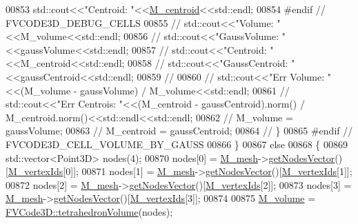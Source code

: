 \begin{DoxyCode}
00853         std::cout<<\textcolor{stringliteral}{"Centroid: "}<<\hyperlink{classFVCode3D_1_1Mesh3D_1_1Cell3D_a85077932a074f0903d085f9d33a13e09}{M\_centroid}<<std::endl;
00854 \textcolor{preprocessor}{#endif // FVCODE3D\_DEBUG\_CELLS}
00855 \textcolor{comment}{//        std::cout<<"Volume: "<<M\_volume<<std::endl;}
00856 \textcolor{comment}{//        std::cout<<"GaussVolume: "<<gaussVolume<<std::endl;}
00857 \textcolor{comment}{//        std::cout<<"Centroid: "<<M\_centroid<<std::endl;}
00858 \textcolor{comment}{//        std::cout<<"GaussCentroid: "<<gaussCentroid<<std::endl;}
00859 \textcolor{comment}{//}
00860 \textcolor{comment}{//        std::cout<<"Err Volume: "<<(M\_volume - gaussVolume) / M\_volume<<std::endl;}
00861 \textcolor{comment}{//        std::cout<<"Err Centrois: "<<(M\_centroid - gaussCentroid).norm() /
       M\_centroid.norm()<<std::endl<<std::endl;}
00862 \textcolor{comment}{//        M\_volume = gaussVolume;}
00863 \textcolor{comment}{//        M\_centroid = gaussCentroid;}
00864 \textcolor{comment}{//    \}}
00865 \textcolor{preprocessor}{#endif // FVCODE3D\_CELL\_VOLUME\_BY\_GAUSS}
00866     \}
00867     \textcolor{keywordflow}{else}
00868     \{
00869         std::vector<Point3D> nodes(4);
00870         nodes[0] = \hyperlink{classFVCode3D_1_1Mesh3D_1_1Cell3D_a5f593479ad61eb1a043b7ec977db39bb}{M\_mesh}->\hyperlink{classFVCode3D_1_1Mesh3D_a04162ec60e0fe52674b3ecbb7de1185c}{getNodesVector}()[\hyperlink{classFVCode3D_1_1Mesh3D_1_1Cell3D_a1c43369fa1a00208ff3293aad35a70aa}{M\_vertexIds}[0]];
00871         nodes[1] = \hyperlink{classFVCode3D_1_1Mesh3D_1_1Cell3D_a5f593479ad61eb1a043b7ec977db39bb}{M\_mesh}->\hyperlink{classFVCode3D_1_1Mesh3D_a04162ec60e0fe52674b3ecbb7de1185c}{getNodesVector}()[\hyperlink{classFVCode3D_1_1Mesh3D_1_1Cell3D_a1c43369fa1a00208ff3293aad35a70aa}{M\_vertexIds}[1]];
00872         nodes[2] = \hyperlink{classFVCode3D_1_1Mesh3D_1_1Cell3D_a5f593479ad61eb1a043b7ec977db39bb}{M\_mesh}->\hyperlink{classFVCode3D_1_1Mesh3D_a04162ec60e0fe52674b3ecbb7de1185c}{getNodesVector}()[\hyperlink{classFVCode3D_1_1Mesh3D_1_1Cell3D_a1c43369fa1a00208ff3293aad35a70aa}{M\_vertexIds}[2]];
00873         nodes[3] = \hyperlink{classFVCode3D_1_1Mesh3D_1_1Cell3D_a5f593479ad61eb1a043b7ec977db39bb}{M\_mesh}->\hyperlink{classFVCode3D_1_1Mesh3D_a04162ec60e0fe52674b3ecbb7de1185c}{getNodesVector}()[\hyperlink{classFVCode3D_1_1Mesh3D_1_1Cell3D_a1c43369fa1a00208ff3293aad35a70aa}{M\_vertexIds}[3]];
00874 
00875         \hyperlink{classFVCode3D_1_1Mesh3D_1_1Cell3D_a7616a6d28fcd8013bc52f4d754569e60}{M\_volume} = \hyperlink{namespaceFVCode3D_a8a6b07162e2801b628c3bd4057b9f221}{FVCode3D::tetrahedronVolume}(nodes);

\end{DoxyCode}
